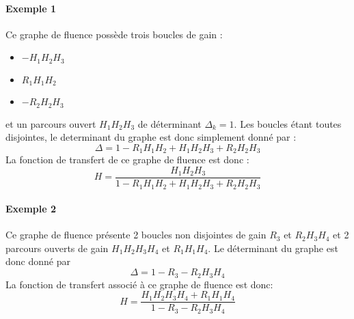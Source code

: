 \paragraph{Exemple 1}

\begin{center}
    
\end{center}
Ce graphe de fluence possède trois boucles de gain :
\begin{itemize}
    \item $-H_1H_2H_3$
    \item $R_1H_1H_2$
    \item $-R_2H_2H_3$ 
\end{itemize}
et un parcours ouvert $H_1H_2H_3$ de déterminant $\Delta_k=1$. Les boucles 
étant toutes disjointes, le determinant du graphe est donc simplement 
donné par :
$$
\Delta=1-R_1H_1H_2+H_1H_2H_3+R_2H_2H_3
$$
La fonction de transfert de ce graphe de fluence est donc :
$$
H=\dfrac{H_1H_2H_3}{1-R_1H_1H_2+H_1H_2H_3+R_2H_2H_3}
$$

\paragraph{Exemple 2}

\begin{center}
    
\end{center}
Ce graphe de fluence présente 2 boucles non disjointes de gain $R_3$ 
et $R_2H_3H_4$ et 2 parcours ouverts de gain $H_1H_2H_3H_4$ et $R_1H_1H_4$.
Le déterminant du graphe est donc donné par 
$$
\Delta=1-R_3-R_2H_3H_4
$$
La fonction de transfert associé à ce graphe de fluence est donc:
$$
H=\dfrac{H_1H_2H_3H_4+R_1H_1H_4}{1-R_3-R_2H_3H_4}
$$




